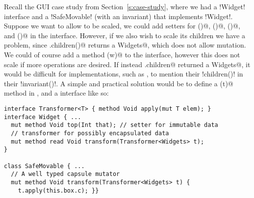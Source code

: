 Recall the GUI case study from Section~\ref{s:case-study}, where we had a \Q!Widget! interface and a \Q!SafeMovable! (with an invariant) that implements \Q!Widget!.
Suppose we want to allow \Q@Widget@s to be scaled, we could add \Q@mut@ setters for \Q@width()@, \Q@height()@, \Q@left()@, and \Q@top()@ in the \Q@Widget@ interface. However, if we also wish to scale its children we have a problem, since \Q@Widget.children()@ returns a \Q@read Widgets@, which does not allow mutation. We could of course add a \Q@mut@ method \Q@zoom(w)@ to the \Q@Widget@ interface, however this does not scale if more operations are desired. If instead \Q@Widget.children@ returned a \Q@mut Widgets@, it would be difficult for \Q@Widget@ implementations, such as \Q@SafeMovable@, 
to mention their \Q!children()! in their \Q!invariant()!.
A simple and practical solution would be to define a \Q@transform(t)@ method in \Q@Widget@, and a \Q@Transformer@ interface 
like so:
\begin{lstlisting}[escapechar=\%]
interface Transformer<T> { method Void apply(mut T elem); }
interface Widget { ...
  mut method Void top(Int that); // setter for immutable data
  // transformer for possibly encapsulated data
  mut method read Void transform(Transformer<Widgets> t);
}

class SafeMovable { ...
  // A well typed capsule mutator
  mut method Void transform(Transformer<Widgets> t) {
    t.apply(this.box.c); }}
\end{lstlisting}
